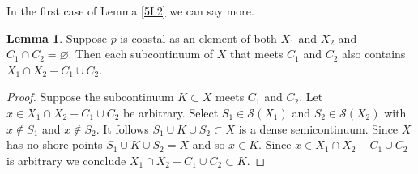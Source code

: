 \documentclass[12pt]{article}
\theoremstyle{plain}
\theoremstyle{definition}
\newtheorem{lemma}[theorem]{Lemma}
\newcommand{\0}{\ensuremath{\varnothing}}
\newcommand{\cS}{\ensuremath{\mathcal S}}
\begin{document}
In the first case of Lemma \ref{5L2} we can say more.


\begin{lemma}\label{5L3}
Suppose $p$ is coastal as an element of both $X_1$ and $X_2$ and \mbox{$C_1 \cap C_2= \0$}.
Then each subcontinuum of $X$ that meets $C_1$ and $C_2$ also contains $ X_1 \cap X_2 - C_1 \cup C_2 $.
\end{lemma}

\begin{proof}
Suppose the subcontinuum $K \subset X$ meets $C_1$ and $C_2$.
Let $x \in X_1 \cap X_2 - C_1 \cup C_2 $ be arbitrary.
Select $S_1 \in \cS(X_1)$ and $S_2 \in \cS(X_2)$ with $x \notin S_1$ and $x \notin S_2$.
It follows $S_1 \cup K \cup S_2 \subset X$ is a dense semicontinuum.
Since $X$ has no shore points $S_1 \cup K \cup S_2 = X$ and so $x \in K$.
Since $x \in  X_1 \cap X_2 - C_1 \cup C_2  $ is arbitrary we conclude $ X_1 \cap X_2 - C_1 \cup C_2  \subset K$.
\end{proof}
\end{document}

